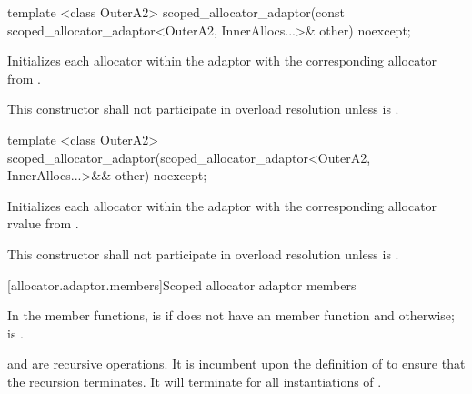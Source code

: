 %
\begin{itemdecl}
template <class OuterA2>
  scoped_allocator_adaptor(const scoped_allocator_adaptor<OuterA2,
                                                          InnerAllocs...>& other) noexcept;
\end{itemdecl}

\begin{itemdescr}
\pnum
\effects Initializes each allocator within the adaptor with the corresponding allocator
from .

\pnum
\remarks This constructor shall not participate in overload resolution unless
 is .
\end{itemdescr}

%
\begin{itemdecl}
template <class OuterA2>
  scoped_allocator_adaptor(scoped_allocator_adaptor<OuterA2,
                                                    InnerAllocs...>&& other) noexcept;
\end{itemdecl}

\begin{itemdescr}
\pnum
\effects Initializes each allocator within the adaptor with the corresponding allocator rvalue
from .

\pnum
\remarks This constructor shall not participate in overload resolution unless
 is .
\end{itemdescr}

[allocator.adaptor.members]{Scoped allocator adaptor members}

\pnum
In the  member functions,
 is  if  does not have an
 member function and
otherwise;
 is
.
\begin{note}  and
 are recursive operations. It
is incumbent upon the definition of  to ensure that the
recursion terminates. It will terminate for all instantiations of
. \end{note}

